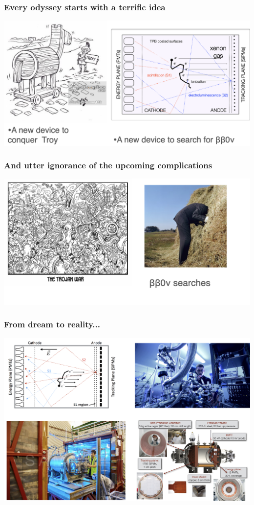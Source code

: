 
\begin{frame}
\frametitle{Every odyssey starts with a terrific idea}
\includegraphics[scale=0.30]{img/nextTroy.png}
\end{frame}

\begin{frame}
\frametitle{And utter ignorance of the upcoming complications}
\includegraphics[scale=0.30]{img/bbAndTroy.png}
\end{frame}

\begin{frame}
\frametitle{From dream to reality...}
\includegraphics[scale=0.30]{img/nextCollague.png}
\end{frame}

